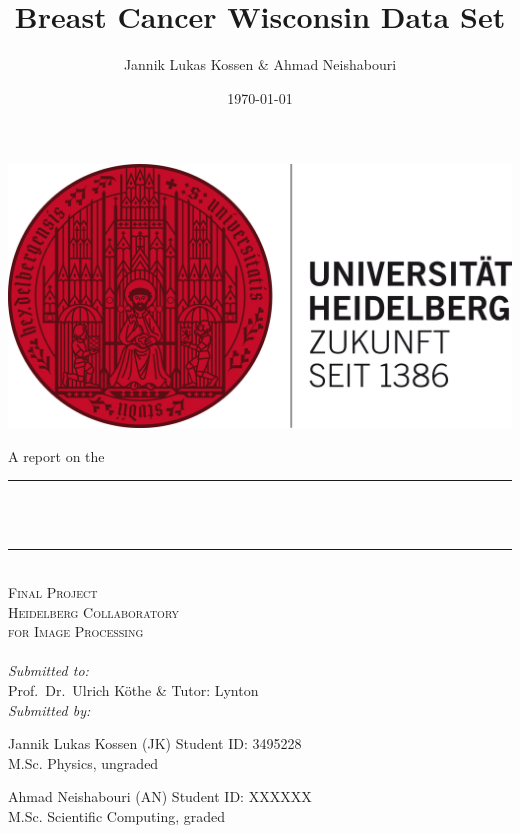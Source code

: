 \documentclass[12pt, a4paper]{scrartcl}
\title{Breast Cancer Wisconsin Data Set} %
\author{Jannik Lukas Kossen \& Ahmad Neishabouri}                               %
\date{\today}                                         %
\makeatletter
\let\thetitle\@title
\let\thedate\@date
\makeatother
\begin{document}

\begin{titlepage}
    \centering
    \includegraphics[scale = 0.6]{hdlogo}\\[2.0 cm]  %
     \begin{flushleft}
     \large  \hspace{1cm} A report on the 
	\end{flushleft}      
     \centering
    \rule{\linewidth}{0.2 mm} \\[0.4 cm]
    { \huge \bfseries \thetitle}\\
    \rule{\linewidth}{0.2 mm} \\[1.5 cm]
    
    \textsc{\LARGE Final Project}\\[0.5 cm]               %
    \textsc{\Large Heidelberg Collaboratory \\[0.5em] for Image Processing}\\[2.0 cm]  %
    \thedate
   	\\[3em]
    \large
            \emph{Submitted to:}\\[1em]
            Prof.\ Dr.\ Ulrich Köthe \& Tutor: Lynton\\[1cm]
            \emph{Submitted by:} \\[1.5em]
            \begin{minipage}{0.4\textwidth}            
            	\begin{flushleft} 
					\large Jannik Lukas Kossen (JK) Student ID: 3495228 \\
					\small M.Sc. Physics, ungraded\\
      		  \end{flushleft}
      		 \end{minipage}
            \begin{minipage}{0.4\textwidth}            
            	\begin{flushright} 
    	    	    \large Ahmad Neishabouri (AN) Student ID: XXXXXX \\ 
         	   		\small M.Sc. Scientific Computing, graded
      		  \end{flushright}
      		 \end{minipage}\\[2 cm]


        
 
\end{titlepage}
\end{document}
